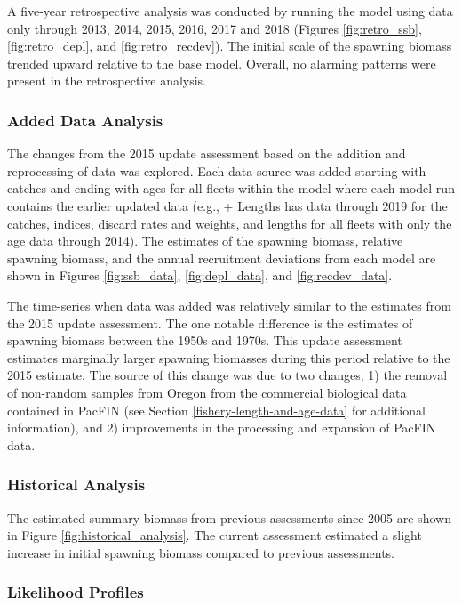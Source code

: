 \documentclass[12pt,]{article}
\begin{document}
A five-year retrospective analysis was conducted by running the model
using data only through 2013, 2014, 2015, 2016, 2017 and 2018 (Figures
\ref{fig:retro_ssb}, \ref{fig:retro_depl}, and \ref{fig:retro_recdev}).
The initial scale of the spawning biomass trended upward relative to the
base model. Overall, no alarming patterns were present in the
retrospective analysis.

\subsubsection{Added Data Analysis}\label{added-data-analysis}

The changes from the 2015 update assessment based on the addition and
reprocessing of data was explored. Each data source was added starting
with catches and ending with ages for all fleets within the model where
each model run contains the earlier updated data (e.g., + Lengths has
data through 2019 for the catches, indices, discard rates and weights,
and lengths for all fleets with only the age data through 2014). The
estimates of the spawning biomass, relative spawning biomass, and the
annual recruitment deviations from each model are shown in Figures
\ref{fig:ssb_data}, \ref{fig:depl_data}, and \ref{fig:recdev_data}.

The time-series when data was added was relatively similar to the
estimates from the 2015 update assessment. The one notable difference is
the estimates of spawning biomass between the 1950s and 1970s. This
update assessment estimates marginally larger spawning biomasses during
this period relative to the 2015 estimate. The source of this change was
due to two changes; 1) the removal of non-random samples from Oregon
from the commercial biological data contained in PacFIN (see Section
\ref{fishery-length-and-age-data} for additional information), and 2)
improvements in the processing and expansion of PacFIN data.

\subsubsection{Historical Analysis}\label{historical-analysis}

The estimated summary biomass from previous assessments since 2005 are
shown in Figure \ref{fig:historical_analysis}. The current assessment
estimated a slight increase in initial spawning biomass compared to
previous assessments.

\subsubsection{Likelihood Profiles}\label{likelihood-profiles}
\end{document}
